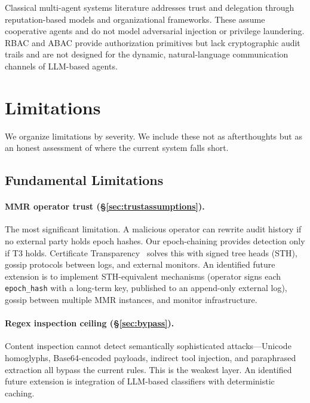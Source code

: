\documentclass[11pt,a4paper]{article}
\begin{document}
Classical multi-agent systems literature addresses trust and delegation through reputation-based
models and organizational frameworks. These assume cooperative agents and do not model
adversarial injection or privilege laundering. RBAC and ABAC provide authorization primitives
but lack cryptographic audit trails and are not designed for the dynamic, natural-language
communication channels of LLM-based agents.


\section{Limitations}\label{sec:limitations}

We organize limitations by severity. We include these not as afterthoughts but as an honest
assessment of where the current system falls short.

\subsection{Fundamental Limitations}

\paragraph{MMR operator trust (\S\ref{sec:trustassumptions}).}
The most significant limitation. A malicious operator can rewrite audit history if no external
party holds epoch hashes. Our epoch-chaining provides detection only if T3 holds. Certificate
Transparency~\cite{ct} solves this with signed tree heads (STH), gossip protocols between logs,
and external monitors. An identified future extension is to implement STH-equivalent mechanisms
(operator signs each \texttt{epoch\_hash} with a long-term key, published to an append-only
external log), gossip between multiple MMR instances, and monitor infrastructure.

\paragraph{Regex inspection ceiling (\S\ref{sec:bypass}).}
Content inspection cannot detect semantically sophisticated attacks---Unicode homoglyphs,
Base64-encoded payloads, indirect tool injection, and paraphrased extraction all bypass the
current rules. This is the weakest layer. An identified future extension is integration of
LLM-based classifiers with deterministic caching.
\end{document}
